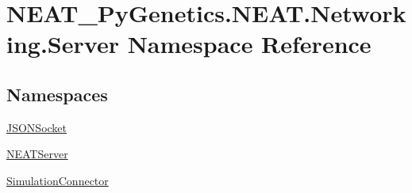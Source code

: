 \hypertarget{namespaceNEAT__PyGenetics_1_1NEAT_1_1Networking_1_1Server}{}\section{N\+E\+A\+T\+\_\+\+Py\+Genetics.\+N\+E\+A\+T.\+Networking.\+Server Namespace Reference}
\label{namespaceNEAT__PyGenetics_1_1NEAT_1_1Networking_1_1Server}
\subsection*{Namespaces}
\begin{DoxyCompactItemize}
\item 
 \hyperlink{namespaceNEAT__PyGenetics_1_1NEAT_1_1Networking_1_1Server_1_1JSONSocket}{J\+S\+O\+N\+Socket}
\item 
 \hyperlink{namespaceNEAT__PyGenetics_1_1NEAT_1_1Networking_1_1Server_1_1NEATServer}{N\+E\+A\+T\+Server}
\item 
 \hyperlink{namespaceNEAT__PyGenetics_1_1NEAT_1_1Networking_1_1Server_1_1SimulationConnector}{Simulation\+Connector}
\end{DoxyCompactItemize}
